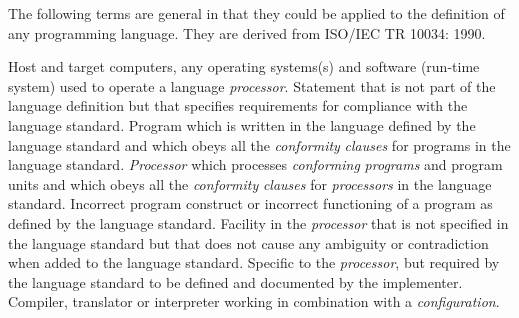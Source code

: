 \begin{optDefinition}
The following terms are general in that they could be applied to the
definition of any programming language.  They are derived from ISO/IEC
TR 10034: 1990.
%
\begin{definitions}
     Host and target
    computers, any operating systems(s) and software (run-time system) used to
    operate a language {\em processor}.
     Statement
    that is not part of the language definition but that specifies requirements
    for compliance with the language standard.
     Program
    which is written in the language defined by the language standard and which
    obeys all the {\em conformity} {\em clauses} for programs in the language
    standard.
     {\em
        Processor} which processes {\em conforming} {\em programs} and program
    units and which obeys all the {\em conformity} {\em clauses} for {\em
        processors} in the language standard.
     Incorrect program construct or
    incorrect functioning of a program as defined by the language standard.
     Facility in the {\em
        processor} that is not specified in the language standard but that does
    not cause any ambiguity or contradiction when added to the language
    standard.
    Specific to the {\em processor}, but required by the language standard to be
    defined and documented by the implementer.
     Compiler, translator or
    interpreter working in combination with a {\em configuration}.
\end{definitions}
\end{optDefinition}
%
